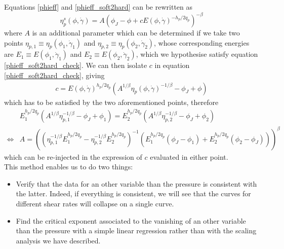 \documentclass[class=article, float=false, crop=false]{standalone}
\begin{document}
Equations \ref{phieff} and \ref{phieff_soft2hard} can be rewritten as
\begin{equation}
\eta_p^s(\phi,\dot{\gamma}) = A\left(\phi_J-\phi +cE(\phi,\dot{\gamma})^{-h_p/2q_p}\right)^{-\beta}
\label{phieff_soft2hard_check}
\end{equation}
where $A$ is an additional parameter which can be determined if we take two points $\eta_{p,1} \equiv \eta_p(\phi_1,\dot{\gamma}_1)$ and $\eta_{p,2} \equiv \eta_p(\phi_2,\dot{\gamma}_2)$, whose corresponding energies are $E_1 \equiv E(\phi_1,\dot{\gamma}_1)$ and $E_2 \equiv E(\phi_2,\dot{\gamma}_2)$, which we hypothesise satisfy equation \ref{phieff_soft2hard_check}. We can then isolate $c$ in equation \ref{phieff_soft2hard_check}, giving
\begin{align*}
c = E(\phi,\dot{\gamma})^{h_p/2q_p}\left(A^{1/\beta}\eta_p(\phi,\dot{\gamma})^{-1/\beta}-\phi_J+\phi\right)
\end{align*}
which has to be satisfied by the two aforementioned points, therefore
\begin{align*}
&E_1^{h_p/2q_p}\left(A^{1/\beta}\eta_{p,1}^{-1/\beta}-\phi_J+\phi_1\right) = E_2^{h_p/2q_p}\left(A^{1/\beta}\eta_{p,2}^{-1/\beta}-\phi_J+\phi_2\right)\\
\Leftrightarrow &A=\left(\left(\eta_{p,1}^{-1/\beta}E_1^{h_p/2q_p} - \eta_{p,2}^{-1/\beta}E_2^{h_p/2q_p}\right)^{-1}\left(E_1^{h_p/2q_p}(\phi_J-\phi_1) + E_2^{h_p/2q_p}(\phi_2-\phi_J)\right)\right)^{\beta}
\end{align*}
which can be re-injected in the expression of $c$ evaluated in either point.\\


This method enables us to do two things:
\begin{itemize}
\item Verify that the data for an other variable than the pressure is consistent with the latter. Indeed, if everything is consistent, we will see that the curves for different shear rates will collapse on a single curve.
\item Find the critical exponent associated to the vanishing of an other variable than the pressure with a simple linear regression rather than with the scaling analysis we have described.
\end{itemize}
\end{document}
